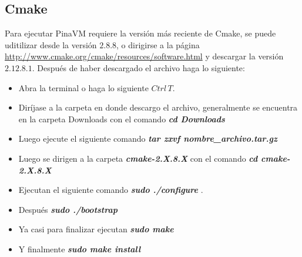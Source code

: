 \documentclass[12pt,graphicx,caption,rotating]{article}
\begin{document}
\subsection{Cmake}
\noindent
Para ejecutar PinaVM requiere la versión más reciente de Cmake, se  puede uditilizar desde la versión $2.8.8$, o dirigirse a la página \url{http://www.cmake.org/cmake/resources/software.html} y descargar la versión $2.12.8.1$. Después de haber descargado el archivo haga lo siguiente:
\begin{itemize}
 \item Abra la terminal o haga lo siguiente $Ctrl \, T$.
 \item Diríjase a la carpeta en donde descargo el archivo, generalmente se encuentra en la carpeta Downloads con el comando \textbf{\textit{cd Downloads}} 
 \item Luego ejecute el siguiente comando \textbf{\textit{tar zxvf nombre\_archivo.tar.gz}} 
 \item Luego se dirigen a la carpeta \textbf{\textit{cmake-2.X.8.X}} con el comando \textbf{\textit{cd cmake-2.X.8.X}} 
 \item Ejecutan el siguiente comando \textbf{\textit{sudo ./configure}} .
 \item Después \textbf{\textit{sudo ./bootstrap}} 
 \item Ya casi para finalizar ejecutan \textbf{\textit{sudo make}} 
 \item Y finalmente \textbf{\textit{sudo make install}} 
\end{itemize}
\end{document}
